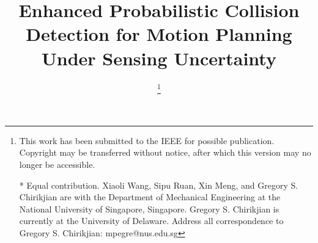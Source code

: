 \documentclass[conference]{IEEEtran}
\begin{document}


\title{Enhanced Probabilistic Collision Detection for Motion Planning Under Sensing Uncertainty }


\author{ 
\and
{}
\and
{}
\and
{}
\thanks{
This work has been submitted to the IEEE for possible publication. Copyright may be transferred without notice, after which this version may no longer be accessible.

* Equal contribution. Xiaoli Wang, Sipu Ruan, Xin Meng, and Gregory S. Chirikjian are with the Department of Mechanical Engineering at the National University of Singapore, Singapore. Gregory S. Chirikjian is currently at the University of Delaware. Address all correspondence to Gregory S. Chirikjian: mpegre@nus.edu.sg}
}



\maketitle
\end{document}

